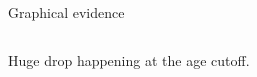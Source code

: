 \documentclass[notes,11pt, aspectratio=169]{beamer}
\newenvironment{wideitemize}{\itemize\addtolength{\itemsep}{0.4em}}{\enditemize}
\begin{document}
\begin{frame}{Graphical evidence}
	\begin{columns}
		\begin{column}{0.5\textwidth}
	\end{column}	
		\begin{column}{0.5\textwidth}
	\end{column}	
\end{columns}\vspace{2em}

	\begin{wideitemize}
	\item Huge drop happening at the age cutoff.
	\end{wideitemize}
\end{frame}
\end{document}
